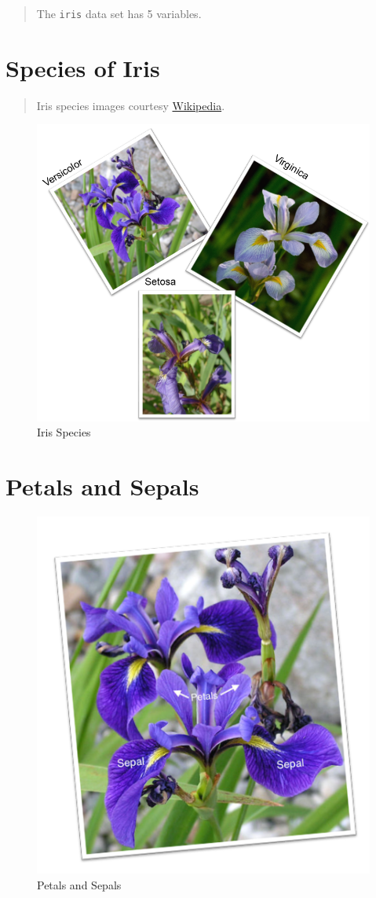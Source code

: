 \documentclass[]{article}
\begin{document}
\begin{quote}
The \texttt{iris} data set has 5 variables.
\end{quote}

\hypertarget{species-of-iris}{%
\section{Species of Iris}\label{species-of-iris}}

\begin{quote}
Iris species images courtesy
\href{https://www.wikipedia.org/}{Wikipedia}.
\end{quote}

\begin{figure}
\centering
\includegraphics[width=0.75\linewidth]{iris-species.png}
\caption{Iris Species}
\end{figure}

\hypertarget{petals-and-sepals}{%
\section{Petals and Sepals}\label{petals-and-sepals}}

\begin{figure}
\centering
\includegraphics[width=0.75\linewidth]{petal-sepal.png}
\caption{Petals and Sepals}
\end{figure}
\end{document}

